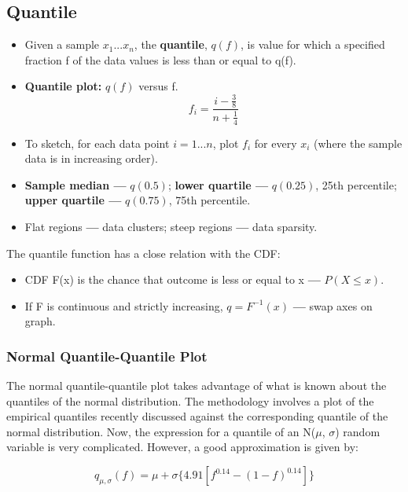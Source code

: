 \documentclass[10pt, letterpaper, twoside]{article}
\begin{document}
\begin{multicols}{2}
\subsection{Quantile}

\begin{itemize}
    \item Given a sample $x_1 ... x_n$, the \textbf{quantile}, $q(f)$, is value for which a specified fraction f of the data values is less than or equal to q(f).
    \item \textbf{Quantile plot:} $q(f)$ versus f.
    \begin{equation*}
        f_i = \frac{i - \frac{3}{8}}{n + \frac{1}{4}}
    \end{equation*}
    \item To sketch, for each data point $i = 1 ... n$, plot $f_i$ for every $x_i$ (where the sample data is in increasing order).
    \item \textbf{Sample median ---} $q(0.5)$; \textbf{lower quartile ---} $q(0.25)$, 25th percentile; \textbf{upper quartile ---} $q(0.75)$, 75th percentile.
    \item Flat regions \textbf{---} data clusters; steep regions \textbf{---} data sparsity.    
\end{itemize}

The quantile function has a close relation with the CDF:

\begin{itemize}
    \item CDF F(x) is the chance that outcome is less or equal to x \textbf{---} $P(X \leq x)$.
    \item If F is continuous and strictly increasing, $q = F^{-1}(x)$ \textbf{---} swap axes on graph.
\end{itemize}

\subsubsection*{Normal Quantile-Quantile Plot}

The normal quantile-quantile plot takes advantage of what is known about the quantiles of the normal distribution. The methodology involves a plot of the empirical quantiles recently discussed against the corresponding quantile of the normal distribution. Now, the expression for a quantile of an N($\mu$, $\sigma$) random variable is
very complicated. However, a good approximation is given by:

\begin{equation*}
    q_{\mu,\sigma}(f) = \mu + \sigma\{4.91[f^{0.14}-(1-f)^{0.14}]\}
\end{equation*}


\end{multicols}
\end{document}
